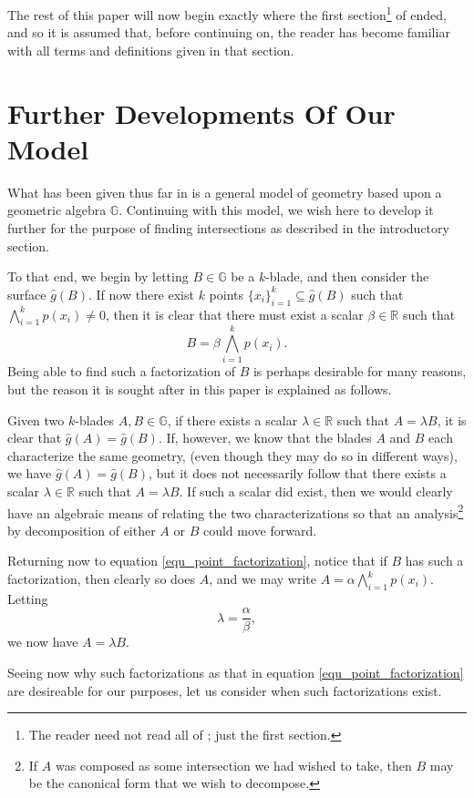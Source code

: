 \documentclass{birkjour}
\theoremstyle{definition}
\theoremstyle{remark}
\numberwithin{equation}{section}
\newcommand{\R}{\mathbb{R}}
\newcommand{\G}{\mathbb{G}}
\newcommand{\gh}{\hat{g}}
\begin{document}
The rest of this paper will now begin exactly where the first section\footnote{The reader
need not read all of \cite{}; just the first section.} of \cite{} ended, and
so it is assumed that, before continuing on, the reader has become familiar with
all terms and definitions given in that section.

\section{Further Developments Of Our Model}

What has been given thus far in \cite{} is a general model of geometry based upon
a geometric algebra $\G$.  Continuing with this model, we wish here to develop it
further for the purpose of finding intersections as described in the introductory section.

To that end, we begin by letting $B\in\G$ be a $k$-blade, and then consider the surface $\gh(B)$.
If now there exist $k$ points $\{x_i\}_{i=1}^k\subseteq\gh(B)$ such that $\bigwedge_{i=1}^k p(x_i)\neq 0$,
then it is clear that there must exist a scalar $\beta\in\R$ such that
\begin{equation}\label{equ_point_factorization}
B = \beta\bigwedge_{i=1}^k p(x_i).
\end{equation}
Being able to find such a factorization of $B$ is perhaps desirable for many reasons, but the
reason it is sought after in this paper is explained as follows.

Given two $k$-blades $A,B\in\G$, if there exists a scalar $\lambda\in\R$
such that $A=\lambda B$, it is clear that $\gh(A)=\gh(B)$.  If, however, we know that
the blades $A$ and $B$ each characterize the same geometry, (even though they may do so in different ways),
we have $\gh(A)=\gh(B)$, but it does not necessarily follow that there exists a
scalar $\lambda\in\R$ such that $A=\lambda B$.  If such a scalar did exist, then
we would clearly have an algebraic means of relating the two characterizations so that
an analysis\footnote{If $A$ was composed as some intersection we had wished to take,
then $B$ may be the canonical form
that we wish to decompose.} by decomposition of either $A$ or $B$ could move forward.

Returning now to equation \eqref{equ_point_factorization}, notice that if $B$ has
such a factorization, then clearly so does $A$, and we may write $A=\alpha\bigwedge_{i=1}^k p(x_i)$.
Letting
\begin{equation*}
\lambda=\frac{\alpha}{\beta},
\end{equation*}
we now have $A=\lambda B$.

Seeing now why such factorizations as that in equation \eqref{equ_point_factorization} are desireable for
our purposes, let us consider when such factorizations exist.


\end{document}
